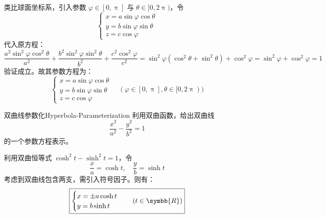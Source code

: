 \begin{solution}
    类比球面坐标系，引入参数 $\varphi \in [0, \uppi]$ 与 $\theta \in [0, 2\uppi)$，令
    \begin{equation}
        \begin{cases}
            x = a \sin \varphi \cos \theta \\
            y = b \sin \varphi \sin \theta \\
            z = c \cos \varphi
        \end{cases}
    \end{equation}
    代入原方程：
    \begin{equation}
        \frac{a^2 \sin^2 \varphi \cos^2 \theta}{a^2} + \frac{b^2 \sin^2 \varphi \sin^2 \theta}{b^2} + \frac{c^2 \cos^2 \varphi}{c^2} = \sin^2 \varphi (\cos^2 \theta + \sin^2 \theta) + \cos^2 \varphi = \sin^2 \varphi + \cos^2 \varphi = 1
    \end{equation}
    验证成立。故其参数方程为：
    \begin{equation}
        \boxed{\begin{cases} x = a \sin \varphi \cos \theta \\ y = b \sin \varphi \sin \theta \\ z = c \cos \varphi \end{cases} \quad (\varphi \in [0, \uppi], \theta \in [0, 2\uppi))}
    \end{equation}
\end{solution}

\begin{problem}{双曲线参数化}{Hyperbola-Parameterization}
    利用双曲函数，给出双曲线
    \begin{equation}
        \frac{x^2}{a^2} - \frac{y^2}{b^2} = 1
    \end{equation}
    的一个参数方程表示。
\end{problem}

\begin{solution}
    利用双曲恒等式 $\cosh^2 t - \sinh^2 t = 1$，令
    \begin{equation}
        \frac{x}{a} = \cosh t, \quad \frac{y}{b} = \sinh t
    \end{equation}
    考虑到双曲线包含两支，需引入符号因子。则有：
    \begin{equation}
        \boxed{\begin{cases} x = \pm a \cosh t \\ y = b \sinh t \end{cases} \quad (t \in \symbb{R})}
    \end{equation}
\end{solution}

